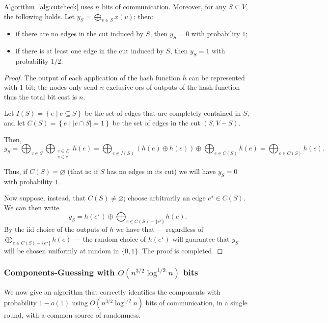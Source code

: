 \begin{lem}
Algorithm~\ref{alg:cutcheck} uses $n$ bits of communication. Moreover, for any $S \subseteq V$, the following holds. Let $y_S =\bigoplus_{v \in S} x(v)$; then:\begin{itemize}
\item if there are no edges in the cut induced by $S$, then $y_S = 0$ with probability $1$;
\item if there is at least one edge in the cut induced by $S$, then $y_S = 1$ with probability $1/2$.
\end{itemize}
\end{lem}
\begin{proof}
The output of each application of the hash function $h$ can be represented with $1$ bit; the nodes only send $n$ exclusive-ors of outputs of the hash function --- thus the total bit cost is $n$.

\smallskip


Let $I(S) = \left\{e \mid e \subseteq S\right\}$ be the set of edges that are completely contained in $S$, and let $C(S) = \left\{e \mid |e \cap S| = 1\right\}$ be the set of edges in the cut $(S,V-S)$.

Then,
$$y_S = \bigoplus_{v \in S} \bigoplus_{\substack{e \in E\\v \in e}} h(e) = \bigoplus_{e \in I(S)} \left(h(e) \oplus h(e)\right) \oplus \bigoplus_{e \in C(S)} h(e)  = \bigoplus_{e \in C(S)} h(e).$$

Thus, if $C(S) = \varnothing$ (that is: if $S$ has no edges in its cut) we will have $y_S = 0$ with probability $1$.

\smallskip

Now suppose, instead, that $C(S) \ne \varnothing$; choose arbitrarily an edge $e^{\star} \in C(S)$. We can then write $$y_S = h(e^{\star}) \oplus \bigoplus_{e \in C(S) - \{e^{\star}\}} h(e).$$
By the iid choice of the outputs of $h$ we  have that  --- regardless of $\bigoplus_{e \in C(S) - \{e^{\star}\}} h(e)$ --- the random choice of $h(e^{\star})$ will guarantee that $y_S$ will be chosen uniformly at random in $\{0,1\}$.
The proof is completed.
\end{proof}

\subsubsection{Components-Guessing with $O\left(n^{3/2} \log^{1/2} n\right)$ bits}

We now give an algorithm that correctly identifies the components with probability $1-o(1)$ using $O\left(n^{3/2} \log^{1/2} n\right)$ bits of communication, in a single round, with a common source of randomness. 
\medskip

